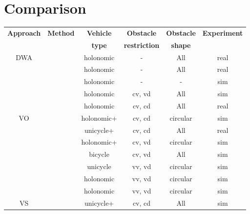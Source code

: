 \newpage
\section{Comparison}%
\label{sec:comparision}


\setlength{\belowrulesep}{0ex}
\setlength{\aboverulesep}{0ex}
\begin{table}[htpb]
    \centering
    \begin{tabular}{|c|c||c|c|c|c|}\toprule
        \textbf{Approach} & \textbf{Method} & \textbf{Vehicle} & \textbf{Obstacle} & \textbf{Obstacle} & \textbf{Experiment} \\
                          &    & \textbf{type} & \textbf{restriction} & \textbf{shape} & \\\toprule
        \multirow{5}{*}{DWA}&\cite{fox1997dynamic} & holonomic & \-- & All & real \\\cmidrule{2-6}
                            &\cite{brock1999high}  & holonomic & \-- & All & real \\\cmidrule{2-6}
                            &\cite{ogren2005convergent}  & holonomic & \-- & \-- & sim \\\cmidrule{2-6}
                            &\cite{seder2007dynamic}   & holonomic & cv, vd & All & sim \\\cmidrule{2-6}
                            &\cite{chung2009safe}  & holonomic & cv, cd & All & real \\\midrule
        \multirow{6}{*}{VO} &\cite{fiorini1998motion}  & holonomic+ & cv, cd & circular & sim \\\cmidrule{2-6}
                            &\cite{prassler2001robotics}  & unicycle+ & cv, cd & All & real \\\cmidrule{2-6}
                            &\cite{shiller2001motion}  & holonomic+ & cv, vd & circular & sim \\\cmidrule{2-6}
                            &\cite{large2005navigation}  & bicycle & cv, vd & All & sim \\\cmidrule{2-6}
                            &\cite{belkhouche2009reactive}  & unicycle & vv, vd & circular & sim \\\cmidrule{2-6}
                            &\cite{van2008reciprocal}  & holonomic & vv, vd & circular & sim \\\cmidrule{2-6}
                            &\cite{van2011reciprocal}  & holonomic & vv, vd & circular & sim \\\midrule
        \multirow{1}{*}{VS} &\cite{owen2005motion,owen2006a}  & unicycle+ & cv, cd & All & sim \\\midrule

\end{tabular}
\end{table}
